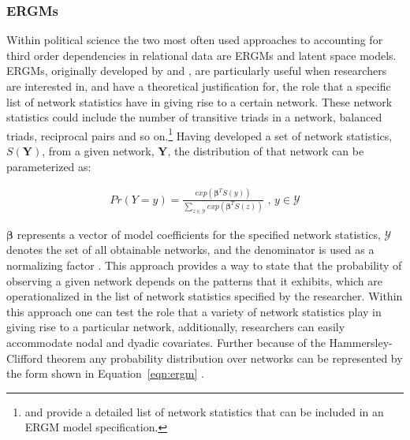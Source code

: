 \subsubsection{\textbf{ERGMs}}

Within political science the two most often used approaches to accounting for third order dependencies in relational data are ERGMs and latent space models. ERGMs, originally developed by \citet{frank:strauss:1986} and \citet{wasserman:pattison:1996}, are particularly useful when researchers are interested in, and have a theoretical justification for, the role that a specific list of network statistics have in giving rise to a certain network. These network statistics could include the number of transitive triads in a network, balanced triads, reciprocal pairs and so on.\footnote{\citet{morris:etal:2008} and \citet{snijders:etal:2006} provide a detailed list of network statistics that can be included in an ERGM model specification.} Having developed a set of network statistics, $S(\mathbf{Y})$, from a given network, $\mathbf{Y}$, the distribution of that network can be parameterized as:

\begin{align}
Pr(Y = y) = \frac{ exp( \bm\beta^{T} S(y)  )  }{ \sum_{z \in \mathcal{Y}} exp( \bm\beta^{T} S(z)  )  } \text{ ,  } y \in \mathcal{Y}
\label{eqn:ergm}
\end{align}

$\bm\beta$ represents a vector of model coefficients for the specified network statistics, $\mathcal{Y}$ denotes the set of all obtainable networks, and the denominator is used as a normalizing factor \citep{hunter:etal:2008}. This approach provides a way to state that the probability of observing a given network depends on the patterns that it exhibits, which are operationalized in the list of network statistics specified by the researcher. Within this approach one can test the role that a variety of network statistics play in giving rise to a particular network, additionally, researchers can easily accommodate nodal and dyadic covariates. Further because of the Hammersley-Clifford theorem any probability distribution over networks can be represented by the form shown in Equation~\ref{eqn:ergm} \cite{hammersley:clifford:1971}. 

